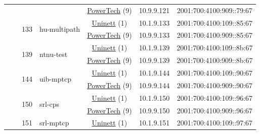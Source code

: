 \begin{small}
\begin{center}
\begin{longtable}{|c|c|c|c|c|c|c|c|}
  &  &  &  & \multicolumn{2}{|c|}{\tiny{\href{http://www.powertech.no}{PowerTech} (9)}} & \tiny{10.9.9.121} & \tiny{2001:700:4100:909::79:67} \\* \cline{3-3}\cline{4-4}\cline{5-5}\cline{6-6}\cline{7-7}\cline{8-8}
  &  & \multirow{2}{*}{\tiny{133}} & \multicolumn{1}{|l|}{\multirow{2}{*}{\tiny{hu-multipath}}} & \multicolumn{2}{|c|}{\tiny{\href{https://www.uninett.no}{Uninett} (1)}} & \tiny{10.1.9.133} & \tiny{2001:700:4100:109::85:67} \\* \cline{5-5}\cline{6-6}\cline{7-7}\cline{8-8}
  &  &  &  & \multicolumn{2}{|c|}{\tiny{\href{http://www.powertech.no}{PowerTech} (9)}} & \tiny{10.9.9.133} & \tiny{2001:700:4100:909::85:67} \\* \cline{3-3}\cline{4-4}\cline{5-5}\cline{6-6}\cline{7-7}\cline{8-8}
  &  & \multirow{2}{*}{\tiny{139}} & \multicolumn{1}{|l|}{\multirow{2}{*}{\tiny{ntnu-test}}} & \multicolumn{2}{|c|}{\tiny{\href{https://www.uninett.no}{Uninett} (1)}} & \tiny{10.1.9.139} & \tiny{2001:700:4100:109::8b:67} \\* \cline{5-5}\cline{6-6}\cline{7-7}\cline{8-8}
  &  &  &  & \multicolumn{2}{|c|}{\tiny{\href{http://www.powertech.no}{PowerTech} (9)}} & \tiny{10.9.9.139} & \tiny{2001:700:4100:909::8b:67} \\* \cline{3-3}\cline{4-4}\cline{5-5}\cline{6-6}\cline{7-7}\cline{8-8}
  &  & \multirow{2}{*}{\tiny{144}} & \multicolumn{1}{|l|}{\multirow{2}{*}{\tiny{uib-mptcp}}} & \multicolumn{2}{|c|}{\tiny{\href{https://www.uninett.no}{Uninett} (1)}} & \tiny{10.1.9.144} & \tiny{2001:700:4100:109::90:67} \\* \cline{5-5}\cline{6-6}\cline{7-7}\cline{8-8}
  &  &  &  & \multicolumn{2}{|c|}{\tiny{\href{http://www.powertech.no}{PowerTech} (9)}} & \tiny{10.9.9.144} & \tiny{2001:700:4100:909::90:67} \\* \cline{3-3}\cline{4-4}\cline{5-5}\cline{6-6}\cline{7-7}\cline{8-8}
  &  & \multirow{2}{*}{\tiny{150}} & \multicolumn{1}{|l|}{\multirow{2}{*}{\tiny{srl-cps}}} & \multicolumn{2}{|c|}{\tiny{\href{https://www.uninett.no}{Uninett} (1)}} & \tiny{10.1.9.150} & \tiny{2001:700:4100:109::96:67} \\* \cline{5-5}\cline{6-6}\cline{7-7}\cline{8-8}
  &  &  &  & \multicolumn{2}{|c|}{\tiny{\href{http://www.powertech.no}{PowerTech} (9)}} & \tiny{10.9.9.150} & \tiny{2001:700:4100:909::96:67} \\* \cline{3-3}\cline{4-4}\cline{5-5}\cline{6-6}\cline{7-7}\cline{8-8}
  &  & \multirow{2}{*}{\tiny{151}} & \multicolumn{1}{|l|}{\multirow{2}{*}{\tiny{srl-mptcp}}} & \multicolumn{2}{|c|}{\tiny{\href{https://www.uninett.no}{Uninett} (1)}} & \tiny{10.1.9.151} & \tiny{2001:700:4100:109::97:67} \\* \cline{5-5}\cline{6-6}\cline{7-7}\cline{8-8}

\end{longtable}
\end{center}
\end{small}
